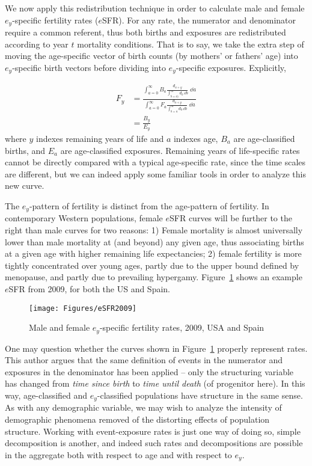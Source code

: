  \FloatBarrier
 \label{sec:exrates}
We now apply this redistribution technique in order to calculate male and 
female $e_y$-specific fertility rates ($e$SFR). For any rate, the numerator 
and denominator require a common referent, thus both births and exposures are 
redistributed according to year $t$ mortality conditions. That
is to say, we take the extra step of moving the age-specific vector
of birth counts (by mothers' or fathers' age) into $e_y$-specific birth
vectors before dividing into $e_y$-specific exposures. Explicitly,

\begin{align}
\label{eq:eSFR}
F_{y} &= \frac{\int _{a = 0} ^{\infty} B_a \frac{d_{a + y}}{\int _{b = a)}
^{\infty} d_b\, \dd b} \;\dd a}{\int _{a = 0} ^{\infty} F_a \frac{d_{a + y}}{\int _{b = a} ^{\infty} d_b\, \dd b} \;\dd a} \\
 &= \frac{B_{y}}{E_{y}}
\end{align}
where $y$ indexes remaining years of life and $a$ indexes age, $B_a$ are
age-classified births, and $E_a$ are age-classified exposures. Remaining years
of life-specific rates cannot be directly compared with a typical age-specific
rate, since the time scales are different, but we 
can indeed apply some familiar tools in order to analyze this new curve.

The $e_y$-pattern of fertility is distinct from the age-pattern of fertility. 
In contemporary Western populations, female $e$SFR curves will be
further to the right than male curves for two reasons: 1) Female mortality is
almost universally lower than male mortality at (and beyond) any given age,
thus associating births at a given age with higher remaining life expectancies; 2)
female fertility is more tightly concentrated over young ages, partly due to the
upper bound defined by menopause, and partly due to prevailing hypergamy.
Figure~\ref{fig:eSFR2009} shows an example $e$SFR from 2009, for both the US and Spain.

\begin{figure}[ht!]
        \centering  
          \caption{Male and female $e_y$-specific fertility rates, 2009, USA and
          Spain}
           \texttt{[image: Figures/eSFR2009]}
          \label{fig:eSFR2009}
\end{figure}

One may question whether the curves shown in Figure~\ref{fig:eSFR2009} properly
represent rates. This author argues that the same definition of events in the
numerator and exposures in the denominator has been applied -- only the
structuring variable has changed from \textit{time since birth} to \textit{time
until death} (of progenitor here). In this way, age-classified and
$e_y$-classified populations have structure in the same sense. As with any
demographic variable, we may wish to analyze the intensity of demographic
phenomena removed of the distorting effects of population structure.
Working with event-exposure rates is just one way of doing so, simple
decomposition is another, and indeed such rates and decompositions are possible
in the aggregate both with respect to age and with respect to
$e_y$.


